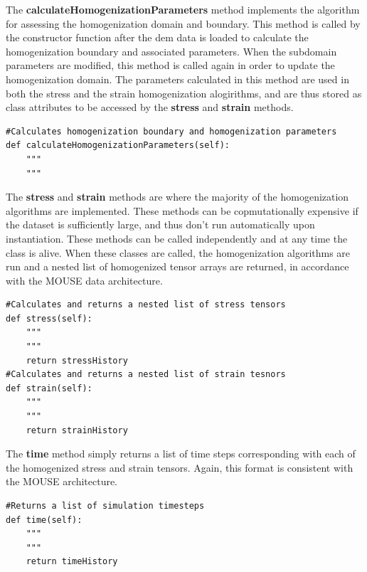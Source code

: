 The \textbf{calculateHomogenizationParameters} method implements the algorithm for assessing the homogenization domain and boundary. This method is called by the constructor function after the \acrshort{dem} data is loaded to calculate the homogenization boundary and associated parameters. When the subdomain parameters are modified, this method is called again in order to update the homogenization domain. The parameters calculated in this method are used in both the stress and the strain homogenization alogirithms, and are thus stored as class attributes to be accessed by the \textbf{stress} and \textbf{strain} methods. 

\begin{lstlisting}[frame=single]                
#Calculates homogenization boundary and homogenization parameters
def calculateHomogenizationParameters(self):
	"""
	"""
\end{lstlisting}

The \textbf{stress} and \textbf{strain} methods are where the majority of the homogenization algorithms are implemented. These methods can be copmutationally expensive if the dataset is sufficiently large, and thus don't run automatically upon instantiation. These methods can be called independently and at any time the class is alive. When these classes are called, the homogenization algorithms are run and a nested list of homogenized tensor arrays are returned, in accordance with the MOUSE data architecture. 
                   
\begin{lstlisting}[frame=single]      
#Calculates and returns a nested list of stress tensors
def stress(self):
	"""
	"""
	return stressHistory
#Calculates and returns a nested list of strain tesnors
def strain(self):
	"""
	"""
	return strainHistory
\end{lstlisting}

The \textbf{time} method simply returns a list of time steps corresponding with each of the homogenized stress and strain tensors. Again, this format is consistent with the MOUSE architecture.

\begin{lstlisting}[frame=single]      
#Returns a list of simulation timesteps
def time(self):
	"""
	"""
	return timeHistory
\end{lstlisting}
